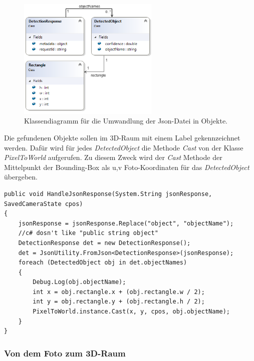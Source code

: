 \begin{figure}[H]
	\centering
	\includegraphics[width=0.6\textwidth]{images/dia_json.PNG}
	\caption[Klassendiagramm für Json-Umwandelung]{Klassendiagramm für die Umwandlung der Json-Datei in Objekte.}
	\label{dia:jsonClasses}
\end{figure}

Die gefundenen Objekte sollen im 3D-Raum mit einem Label gekennzeichnet werden. Dafür wird für jedes \textit{DetectedObject} die Methode \textit{Cast} von der Klasse \textit{PixelToWorld} aufgerufen. Zu diesem Zweck wird der \textit{Cast} Methode der Mittelpunkt der Bounding-Box als u,v Foto-Koordinaten für das \textit{DetectedObject} übergeben.

\begin{lstlisting}
public void HandleJsonResponse(System.String jsonResponse, SavedCameraState cpos)
{
	jsonResponse = jsonResponse.Replace("object", "objectName"); 
	//c# dosn't like "public string object"
	DetectionResponse det = new DetectionResponse();
	det = JsonUtility.FromJson<DetectionResponse>(jsonResponse);
	foreach (DetectedObject obj in det.objectNames)
	{
		Debug.Log(obj.objectName);
		int x = obj.rectangle.x + (obj.rectangle.w / 2);
		int y = obj.rectangle.y + (obj.rectangle.h / 2);
		PixelToWorld.instance.Cast(x, y, cpos, obj.objectName);
	}
}
\end{lstlisting}


\subsubsection{Von dem Foto zum 3D-Raum}


